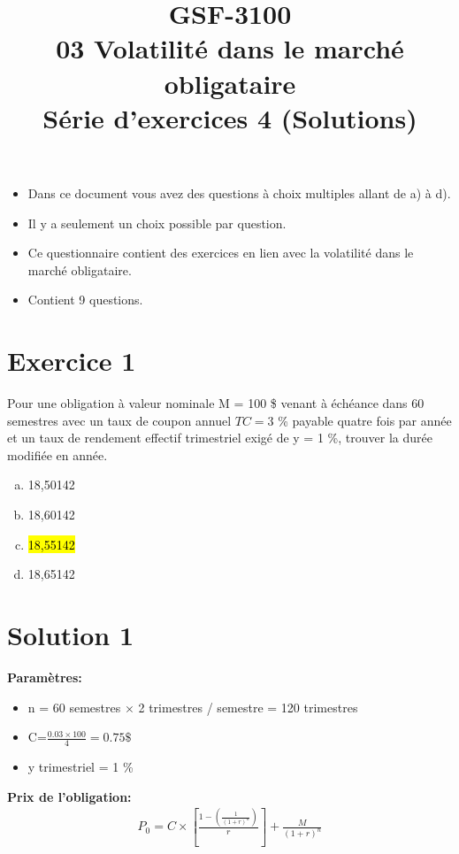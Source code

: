 \documentclass[10pt,a4paper]{article}
\title{GSF-3100 \\
03 Volatilité dans le marché obligataire \\
Série d'exercices 4 (Solutions)}
\begin{document}
\maketitle

\begin{itemize}
\item Dans ce document vous avez des questions à choix multiples allant de a) à d).  
\item Il y a seulement un choix possible par question.
\item Ce questionnaire contient des exercices en lien avec la volatilité dans le marché obligataire.
\item Contient 9 questions. 
\end{itemize}
 





\newpage

\section*{Exercice 1}
Pour une obligation à valeur nominale M = 100 \$ venant à échéance dans 60 semestres avec un taux de coupon annuel $TC= 3$ \% payable quatre fois par année et un taux de rendement effectif trimestriel exigé de y = 1 \%,  trouver la durée modifiée en année.


\begin{enumerate}[a)]
\item 18,50142 
\item 18,60142 
\item  \hl{18,55142}
\item 18,65142 
\end{enumerate}

\section*{Solution 1}

\textbf{Paramètres:}
\begin{itemize}
\item n = 60 semestres $\times$ 2 trimestres / semestre = 120 trimestres
\item C=$\frac{0.03 \times 100}{4}=0.75 \$ $
\item y trimestriel = 1 \%
\end{itemize}

\vspace{0.5cm}

\textbf{Prix de l'obligation:}
\begin{align*}
P_0=C \times \left[ \frac{1-\left(\frac{1}{(1+r)^n} \right)}{r} \right]+\frac{M}{(1+r)^n}
\end{align*}
\end{document}

